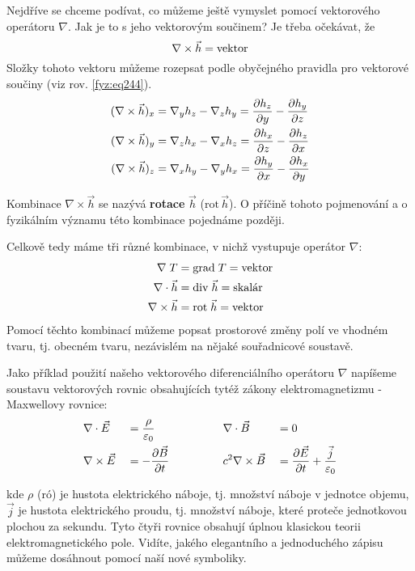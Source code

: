 {      Nejdříve se chceme podívat, co můžeme ještě vymyslet pomocí vektorového operátoru $\nabla$. 
      Jak je to s jeho vektorovým součinem? Je třeba očekávat, že
      \begin{equation}\label{fyz:eq265}
        \nabla\times\vec{h} = \text{vektor}
      \end{equation}
      Složky tohoto vektoru můžeme rozepsat podle obyčejného pravidla pro vektorové součiny (viz 
      rov. \ref{fyz:eq244}).
      \begin{align}
        (\nabla\times\vec{h})_x &= \nabla_yh_z-\nabla_zh_y = \frac{\partial h_z}{\partial y} - \frac{\partial h_y}{\partial z}\\
        (\nabla\times\vec{h})_y &= \nabla_zh_x-\nabla_xh_z = \frac{\partial h_x}{\partial z} - \frac{\partial h_z}{\partial x}\\
        (\nabla\times\vec{h})_z &= \nabla_xh_y-\nabla_yh_x = \frac{\partial h_y}{\partial x} - \frac{\partial h_x}{\partial y}
      \end{align}

      Kombinace $\nabla\times\vec{h}$ se nazývá \textbf{rotace} $\vec{h}$ 
      ($\mathrm{rot}\,\vec{h}$). O příčině tohoto pojmenování a o fyzikálním významu této kombinace 
      pojednáme později.

      Celkově tedy máme tři různé kombinace, v nichž vystupuje operátor $\nabla$:
      \begin{align*}
        \nabla\;T  &=\mathrm{grad\;}T   = \text{vektor}    \\  
        \nabla\cdot\vec{h} &=\mathrm{div}\;\vec{h}  = \text{skalár}    \\
        \nabla\times\vec{h}   &=\mathrm{rot}\;\vec{h}    = \text{vektor}
      \end{align*}
      Pomocí těchto kombinací můžeme popsat prostorové změny polí ve vhodném tvaru, tj. obecném 
      tvaru, nezávislém na nějaké souřadnicové soustavě.

      Jako příklad použití našeho vektorového diferenciálního operátoru $\nabla$ napíšeme soustavu
      vektorových rovnic obsahujících tytéž zákony elektromagnetizmu - Maxwellovy rovnice:
      \begin{alignat}{4}\label{fyz:eq266}
        & \nabla\cdot\vec{E}  && = \frac{\rho}{\varepsilon_0} \hspace{5em} && \nabla\cdot\vec{B}  &&=  0     \\
        & \nabla\times\vec{E}    && = -\frac{\partial \vec{B}}{\partial t}         &&c^2\nabla\times\vec{B}    &&= 
          \frac{\partial \vec{E}}{\partial t} + \frac{\vec{j}}{\varepsilon_0}
      \end{alignat}

      kde $\rho$ (ró) je hustota elektrického náboje, tj. množství náboje v jednotce objemu, 
      $\vec{j}$ je hustota elektrického proudu, tj. množství náboje, které proteče jednotkovou 
      plochou za sekundu. Tyto čtyři rovnice obsahují úplnou klasickou teorii elektromagnetického 
      pole. Vidíte, jakého elegantního a jednoduchého zápisu můžeme dosáhnout pomocí naší nové 
      symboliky.
      
}
